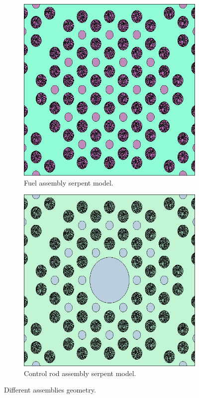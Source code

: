 \documentclass[11pt,letterpaper]{article}
\begin{document}
	\begin{figure}[htbp!]
		\centering
		\begin{subfigure}[t]{0.4\textwidth}
			\centering
			\includegraphics[width=\linewidth]{figures/fuel_block_geom1.png} 
			\caption{Fuel assembly serpent model.}
		\end{subfigure}
		\begin{subfigure}[t]{0.4\textwidth}
			\centering
			\includegraphics[width=\linewidth]{figures/control_block_geom1.png}
			\caption{Control rod assembly serpent model.}
		\end{subfigure}
		\hfill
		\caption{Different assemblies geometry.}
		\label{fig:assemblies}
	\end{figure}
\end{document}
